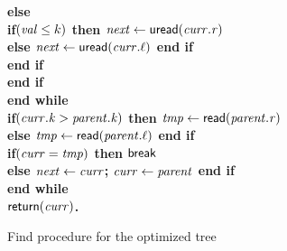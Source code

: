 \begin{figure}[h!]
{{\begin{minipage}[t]{150mm}
\begin{tabbing}
		 \>\>\>\>\> \bf{else} \\
		 \>\>\>\>\>\> \bf{if}$(\ms{val} \leq k)$ \bf{then} $\ms{next} \gets \lit{uread}(\ms{curr.r})$ \\%
		 \>\>\>\>\>\>\> \bf{else} $\ms{next} \gets \lit{uread}(\ms{curr.\ell})$ \bf{end if} \\%
		 \>\>\>\> \bf{end if} \\
		 \>\>\> \bf{end if} \\
		 \>\> \bf{end while} \\
		 \>\> \bf{if}$(\ms{curr.k} > \ms{parent.k})$ \bf{then} $\ms{tmp} \gets \lit{read}(\ms{parent.r})$ \\%
		 \>\>\> \bf{else} $\ms{tmp} \gets \lit{read}(\ms{parent.\ell})$  \bf{end if} \\%
		 \>\> \bf{if}$(\ms{curr} = \ms{tmp})$ \bf{then} $\lit{break}$ \\%
		 \>\>\> \bf{else} $\ms{next} \gets \ms{curr}$; $\ms{curr} \gets \ms{parent}$  {\bf end if} \\%
 		 \> \bf{end while} \\
		 \> $\sf{return}(\ms{curr})$. \\%

		
\end{tabbing}
\normalsize
\end{minipage}
}
\caption{Find procedure for the optimized tree}
\label{fig:tree-opt-find}
}
\end{figure}



